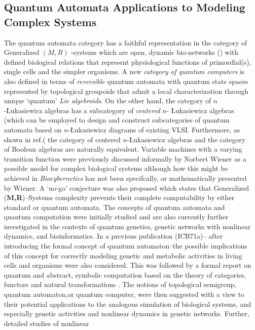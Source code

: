 \documentclass[12pt]{article}
\theoremstyle{plain}
\theoremstyle{definition}
\theoremstyle{plain}
\numberwithin{equation}{section}
\newcommand{\med}{\medbreak}
\begin{document}
\subsection{Quantum Automata Applications to Modeling Complex Systems}
The quantum automata category has a faithful representation in the category of Generalized 
$(M,R)$ -systems which are open, dynamic bio-networks (\cite{ICB87}) with defined biological relations that represent physiological functions of primordial(s), single cells and the simpler organisms. A new \emph{category of quantum computers} is also defined in terms of \emph{reversible} quantum automata with quantum state spaces represented by topological groupoids that admit a local characterization through unique `quantum' \emph{Lie algebroids}. On the other hand, the category of $n$-\L ukasiewicz algebras has a subcategory of \emph{centered} $n$- \L{}ukasiewicz algebras \cite{GV70}  (which can be employed to design and construct subcategories of quantum automata based on $n$-{}\L ukasiewicz diagrams of existing VLSI. Furthermore, as shown in ref.(\cite{GV70} the category of centered $n$-{}\L ukasiewicz algebras and the category of Boolean algebras are naturally equivalent. 
\med
  Variable machines with a varying transition function were previously discussed informally by Norbert Wiener as a possible model for complex biological systems although how this might be achieved in \textit{Biocybernetics} has not been specifcally, or mathematically presented by Wiener. 
\med
  A `no-go' conjecture was also proposed which states that Generalized (\textbf{M,R})--Systems complexity prevents their complete computability by either standard or quantum automata. The concepts of quantum automata and quantum computation were initially studied and are also currently further investigated in the contexts of quantum genetics, genetic networks with nonlinear dynamics, and bioinformatics. In a previous publication (ICB71a)-- after introducing the formal concept of quantum automaton--the possible implications of this concept for correctly modeling genetic and metabolic activities in living cells and organisms were also considered. This was followed by a formal report on quantum and abstract, symbolic computation based on the theory of categories, functors and natural transformations \cite{ICB71b}. The notions of topological semigroup, quantum automaton,or quantum computer, were then suggested with a view to their potential applications to the analogous simulation of biological systems, and especially genetic activities and nonlinear dynamics in genetic networks. Further, detailed studies of nonlinear
\end{document}
